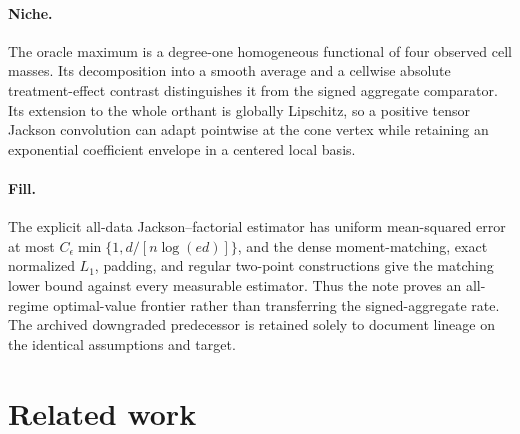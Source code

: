 \documentclass{article}
\begin{document}
\paragraph{Niche.} The oracle maximum is a degree-one homogeneous functional of four observed cell masses. Its decomposition into a smooth average and a cellwise absolute treatment-effect contrast distinguishes it from the signed aggregate comparator. Its extension to the whole orthant is globally Lipschitz, so a positive tensor Jackson convolution can adapt pointwise at the cone vertex while retaining an exponential coefficient envelope in a centered local basis.

\paragraph{Fill.} The explicit all-data Jackson--factorial estimator has uniform mean-squared error at most \(C_\epsilon\min\{1,d/[n\log(ed)]\}\), and the dense moment-matching, exact normalized \(L_1\), padding, and regular two-point constructions give the matching lower bound against every measurable estimator. Thus the note proves an all-regime optimal-value frontier rather than transferring the signed-aggregate rate. The archived downgraded predecessor is retained solely to document lineage on the identical assumptions and target.

\section{Related work}
\end{document}
